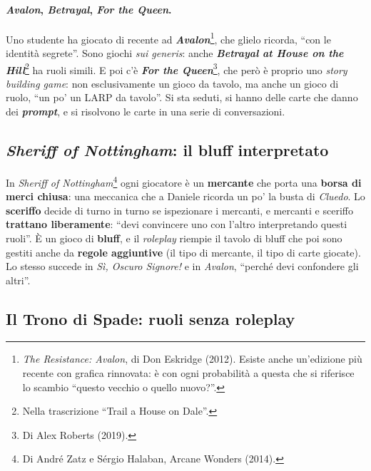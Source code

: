 \paragraph{\emph{Avalon}, \emph{Betrayal}, \emph{For the Queen}.} Uno studente ha giocato di
recente ad \textbf{\emph{Avalon}}\footnote{\emph{The Resistance: Avalon}, di Don Eskridge (2012).
Esiste anche un'edizione più recente con grafica rinnovata: è con ogni probabilità a questa che
si riferisce lo scambio ``questo vecchio o quello nuovo?''.}, che glielo ricorda, ``con le
identità segrete''. Sono giochi \emph{sui generis}: anche \textbf{\emph{Betrayal at House on
the Hill}}\footnote{Nella trascrizione ``Trail a House on Dale''.} ha ruoli simili. E poi c'è
\textbf{\emph{For the Queen}}\footnote{Di Alex Roberts (2019).}, che però è proprio uno
\emph{story building game}: non esclusivamente un gioco da tavolo, ma anche un gioco di ruolo,
``un po' un LARP da tavolo''. Si sta seduti, si hanno delle carte che danno dei
\textbf{\emph{prompt}}, e si risolvono le carte in una serie di conversazioni.

\subsection{\emph{Sheriff of Nottingham}: il bluff interpretato}



In \emph{Sheriff of Nottingham}\footnote{Di André Zatz e Sérgio Halaban, Arcane Wonders (2014).}
ogni giocatore è un \textbf{mercante} che porta una \textbf{borsa di merci chiusa}: una meccanica
che a Daniele ricorda un po' la busta di \emph{Cluedo}. Lo \textbf{sceriffo} decide di turno in
turno se ispezionare i mercanti, e mercanti e sceriffo \textbf{trattano liberamente}: ``devi
convincere uno con l'altro interpretando questi ruoli''. È un gioco di \textbf{bluff}, e il
\emph{roleplay} riempie il tavolo di bluff che poi sono gestiti anche da \textbf{regole
aggiuntive} (il tipo di mercante, il tipo di carte giocate). Lo stesso succede in \emph{Sì,
Oscuro Signore!} e in \emph{Avalon}, ``perché devi confondere gli altri''.

\subsection{Il Trono di Spade: ruoli senza roleplay}

